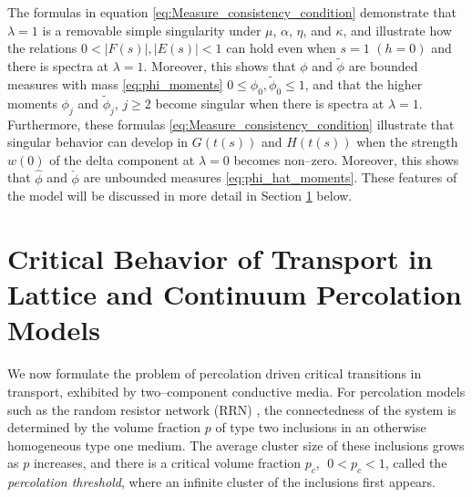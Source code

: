 \documentclass[english,12pt,jmp,graphicx]{revtex4-1}
\newcommand{\ph}{\hat{\phi}}
\begin{document}
The formulas in equation \eqref{eq:Measure_consistency_condition}
demonstrate that $\lambda=1$ is a removable simple singularity under $\mu$,
$\alpha$, $\eta$, and $\kappa$, and illustrate how the relations
$0<|F(s)|,|E(s)|<1$ can hold even when $s=1$ $(h=0)$ and there is
spectra at $\lambda=1$. Moreover, this shows that $\phi$ and $\tilde{\phi}$ are
bounded measures with mass \eqref{eq:phi_moments}
$0\leq\phi_0,\tilde{\phi}_0\leq1$, and that the higher moments $\phi_j$ and
$\tilde{\phi}_j$, $j\geq2$ become singular when there is spectra at
$\lambda=1$. Furthermore, these formulas
\eqref{eq:Measure_consistency_condition} illustrate that singular behavior
can develop in $G(t(s))$ and $H(t(s))$ when the strength $w(0)$ of the
delta component at $\lambda=0$ becomes non--zero. Moreover, this shows that
$\ph$ and $\check{\phi}$ are unbounded measures
\eqref{eq:phi_hat_moments}. These features of the model will be
discussed in more detail in Section \ref{sec:Crit_Behav_of_Transport}
below.      
%
\section{Critical Behavior of Transport in Lattice and Continuum
  Percolation Models}\label{sec:Crit_Behav_of_Transport}
%
We now formulate the problem of percolation driven critical
transitions in transport, exhibited by two--component conductive
media. For percolation models such as the random resistor network (RRN)
\cite{Stauffer-92,Torquato:RHM-02}, the connectedness of the system is
determined by the volume fraction $p$ of type two inclusions in an
otherwise homogeneous type one medium. The average cluster size of
these  inclusions grows as $p$ increases, and there is a critical
volume fraction $p_c$, $\;0<p_c<1$, called the \emph{percolation
  threshold}, where an infinite cluster of the inclusions first
appears.
\end{document}
